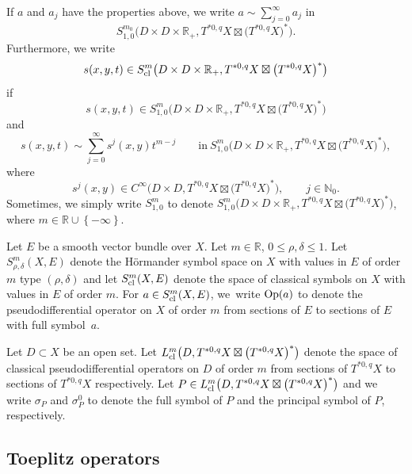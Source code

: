 \documentclass[10pt,a4paper]{amsart}
\numberwithin{equation}{section}
\newcommand{\Real}{\mathbb R}
\newcommand{\N}{\mathbb N}
\newcommand{\set}[1]{\left\{#1\right\}}
\begin{document}
\begin{Definition}
	 	If $a$ and $a_j$ have the properties above, we write $a\sim\sum^{\infty}_{j=0}a_j$ in
	 	\[S^{m_0}_{1,0}\bigl(D\times D\times\mathbb{R}_+,T^{*0,q}X\boxtimes\bigl(T^{*0,q}X\bigr)^*\bigr) .\]
	 	Furthermore, we write
	 	\[
	 	s(x, y, t)\in S^{m}_{{\rm cl }}\bigl(D\times D\times\mathbb{R}_+,T^{*0,q}X\boxtimes\bigl(T^{*0,q}X\bigr)^*\bigr)
	 	\]
	 	if \[s(x, y, t)\in S^{m}_{1,0}\bigl(D\times D\times\mathbb{R}_+,T^{*0,q}X\boxtimes\bigl(T^{*0,q}X\bigr)^*\bigr)\] and
	 	\[
	 		s(x, y, t)\sim\sum^\infty_{j=0}s^j(x, y)t^{m-j}\qquad \text{in} \ S^{m}_{1, 0}
	 		\bigl(D\times D\times\mathbb{R}_+ ,T^{*0,q}X\boxtimes\bigl(T^{*0,q}X\bigr)^*\bigr) ,
	 	\]
	 	where
	 	\[
	 		s^j(x, y)\in{C}^\infty\bigl(D\times D,T^{*0,q}X\boxtimes\bigl(T^{*0,q}X\bigr)^*\bigr),\qquad j\in\N_0 .
	 	\]
	 	Sometimes, we simply write $S^{m}_{1,0}$ to denote
$
S^m_{1,0}\bigl(D\times D\times\mathbb{R}_+,T^{*0,q}X\boxtimes\bigl(T^{*0,q}X\bigr)^*\bigr)$,
 where $m\in\mathbb R\cup\set{-\infty}$.
	 \end{Definition}
	
	 Let $E$ be a smooth
	 vector bundle over $X$. Let $m\in\Real$, $0\leq\rho,\delta\leq1$. Let $S^m_{\rho,\delta}(X,E)$
	 denote the H\"{o}rmander symbol space on $X$ with values in $E$ of order $m$ type $(\rho,\delta)$
	 and let $S^m_{{\rm cl }}(X,E)$
	 denote the space of classical symbols on $X$ with values in $E$ of order $m$.
	 For $a\in S^m_{{\rm cl }}(X,E)$, we~write ${\rm Op }(a)$ to denote the pseudodifferential operator on $X$ of order $m$ from sections of $E$ to sections of $E$ with full symbol~$a$.
	
	 Let $D\subset X$ be an open set. Let
$L^m_{{\rm cl }}\bigl(D,T^{*0,q}X\boxtimes \bigl(T^{*0,q}X\bigr)^*\bigr)$
	 denote the space of classical
	 pseudodifferential operators on $D$ of order $m$ from sections of
	 $T^{*0,q}X$ to sections of $T^{*0,q}X$ respectively. Let $P\in L^m_{{\rm cl }}\bigl(D,T^{*0,q}X\boxtimes \bigl(T^{*0,q}X\bigr)^*\bigr) $ and we write $\sigma_P$ and $\sigma^0_P$ to denote the full symbol of $P$ and the principal symbol of $P$, respectively.
 	
 	 \subsection{Toeplitz operators}
	 \label{sec:toep}
	
\end{document}
